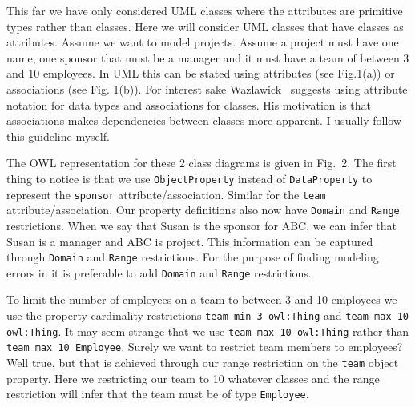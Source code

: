 \documentclass{amsart}
\title{}
\author{}
\date{}
\begin{document}
  \maketitle
  
  This far we have only considered UML classes where the attributes are primitive types rather than classes. Here we will consider UML classes that have classes as attributes. Assume we want to model projects. Assume a project must have one name, one sponsor that must be a manager and it must have a team of between 3 and 10 employees. In UML this can be stated using attributes (see Fig.1(a)) or associations (see Fig. 1(b)). For interest sake Wazlawick~\cite{Wazlawick2014} suggests using attribute notation for data types and associations for classes. His motivation is that associations makes dependencies between classes more apparent. I usually follow this guideline myself.
  
  
  The OWL representation for these 2 class diagrams is given in Fig.~2. The first thing to notice is that we use \texttt{ObjectProperty} instead of \texttt{DataProperty} to represent the \texttt{sponsor} attribute/association. Similar for the \texttt{team} attribute/association. Our property definitions also now have \texttt{Domain} and \texttt{Range} restrictions. When we say that Susan is the sponsor for ABC, we can infer that Susan is a manager and ABC is project. This information can be captured through \texttt{Domain} and \texttt{Range} restrictions. For the purpose of finding modeling errors in it is preferable to add \texttt{Domain} and \texttt{Range} restrictions.
  
  
  To limit the number of employees on a team to between 3 and 10 employees we use the property cardinality restrictions \texttt{team min 3 owl:Thing} and \texttt{team max 10 owl:Thing}. It may seem strange that we use \texttt{team max 10 owl:Thing} rather than \texttt{team max 10 Employee}. Surely we want to restrict team members to employees? Well true, but that is achieved through our range restriction on the \texttt{team} object property. Here we restricting our team to 10 whatever classes and the range restriction will infer that the team 	must be of type \texttt{Employee}. 
  
  
  
 
  

  
  
  
 
\end{document}

